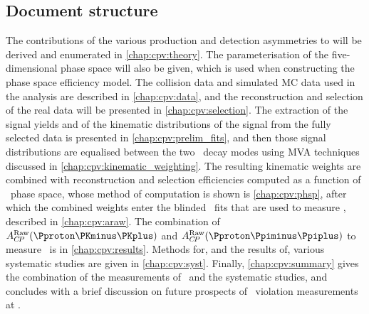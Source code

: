 \subsection{Document structure}
\label{chap:cpv:introduction:overview:structure}

The contributions of the various production and detection asymmetries to \ARaw 
will be derived and enumerated in \cref{chap:cpv:theory}.
The parameterisation of the five-dimensional phase space will also be given, 
which is used when constructing the phase space efficiency model.
The collision data and simulated \ac{MC} data used in the analysis are 
described in \cref{chap:cpv:data}, and the reconstruction and selection of the 
real data will be presented in \cref{chap:cpv:selection}.
The extraction of the signal yields and of the kinematic distributions of the 
signal from the fully selected data is presented in 
\cref{chap:cpv:prelim_fits}, and then those signal distributions are equalised 
between the two \PLambdac\ decay modes using \ac{MVA} techniques discussed in 
\cref{chap:cpv:kinematic_weighting}.
The resulting kinematic weights are combined with reconstruction and selection 
efficiencies computed as a function of \phh\ phase space, whose method of 
computation is shown is \cref{chap:cpv:phsp}, after which the combined weights 
enter the blinded \chisq\ fits that are used to measure \ARaw, described in 
\cref{chap:cpv:araw}.
The combination of $\ARaw(\pKK)$ and $\ARaw(\ppipi)$ to measure \dACP\ is in 
\cref{chap:cpv:results}.
Methods for, and the results of, various systematic studies are given in 
\cref{chap:cpv:syst}.
Finally, \cref{chap:cpv:summary} gives the combination of the measurements of 
\dACP\ and the systematic studies, and concludes with a brief discussion on 
future prospects of \CP\ violation measurements at \lhcb.
